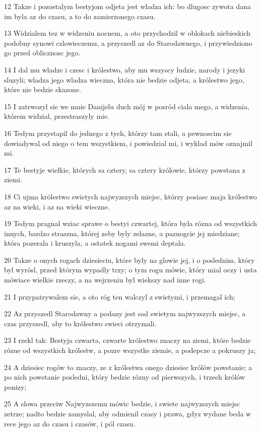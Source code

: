\par 12 Takze i pozostalym bestyjom odjeta jest wladza ich: bo dlugosc zywota dana im byla az do czasu, a to do zamierzonego czasu.
\par 13 Widzialem tez w widzeniu nocnem, a oto przychodzil w oblokach niebieskich podobny synowi czlowieczemu, a przyszedl az do Starodawnego, i przywiedziono go przed oblicznosc jego.
\par 14 I dal mu wladze i czesc i królestwo, aby mu wszyscy ludzie, narody i jezyki sluzyli; wladza jego wladza wieczna, która nie bedzie odjeta, a królestwo jego, które nie bedzie skazone.
\par 15 I zatrwozyl sie we mnie Danijelu duch mój w posród ciala mego, a widzenia, którem widzial, przestraszyly mie.
\par 16 Tedym przystapil do jednego z tych, którzy tam stali, a pewnoscim sie dowiadywal od niego o tem wszystkiem, i powiedzial mi, i wyklad mów oznajmil mi.
\par 17 Te bestyje wielkie, których sa cztery, sa cztery królowie, którzy powstana z ziemi.
\par 18 Ci ujma królestwo swietych najwyzszych miejsc, którzy posiasc maja królestwo az na wieki, i az na wieki wieczne.
\par 19 Tedym pragnal wziac sprawe o bestyi czwartej, która byla rózna od wszystkich innych, bardzo straszna, której zeby byly zelazne, a paznogcie jej miedziane; która pozerala i kruszyla, a ostatek nogami swemi deptala.
\par 20 Takze o onych rogach dziesieciu, które byly na glowie jej, i o poslednim, który byl wyrósl, przed którym wypadly trzy; o tym rogu mówie, który mial oczy i usta mówiace wielkie rzeczy, a na wejrzeniu byl wiekszy nad inne rogi.
\par 21 I przypatrywalem sie, a oto róg ten walczyl z swietymi, i przemagal ich;
\par 22 Az przyszedl Starodawny a podany jest sad swietym najwyzszych miejsc, a czas przyszedl, aby to królestwo swieci otrzymali.
\par 23 I rzekl tak: Bestyja czwarta, czwarte królestwo znaczy na ziemi, które bedzie rózne od wszystkich królestw, a pozre wszystke ziemie, a podepcze a pokruszy ja;
\par 24 A dziesiec rogów to znaczy, ze z królestwa onego dziesiec królów powstanie; a po nich powstanie posledni, który bedzie rózny od pierwszych, i trzech królów ponizy;
\par 25 A slowa przeciw Najwyzszemu mówic bedzie, i swiete najwyzszych miejsc zetrze; nadto bedzie zamyslal, aby odmienil czasy i prawa, gdyz wydane beda w rece jego az do czasu i czasów, i pól czasu.
